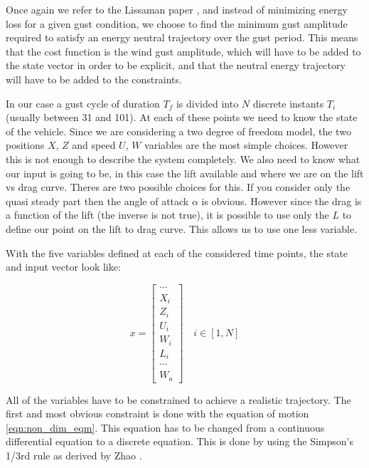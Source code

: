 \par Once again we refer to the Lissaman paper \cite{Lissaman2007neutral}, and instead of minimizing energy loss for a given gust condition, we choose to find the minimum gust amplitude required to satisfy an energy neutral trajectory over the gust period.
This means that the cost function is the wind gust amplitude, which will have to be added to the state vector in order to be explicit, and that the neutral energy trajectory will have to be added to the constraints.

In our case a gust cycle of duration $T_f$ is divided into $N$ discrete instants $T_i$ (usually between 31 and 101).
At each of these points we need to know the state of the vehicle.
Since we are considering a two degree of freedom model, the two positions $X$, $Z$ and speed $U$, $W$ variables are the most simple choices.
However this is not enough to describe the system completely.
We also need to know what our input is going to be, in this case the lift available and where we are on the lift vs drag curve.
Theres are two possible choices for this.
If you consider only the quasi steady part then the angle of attack $\alpha$ is obvious.
However since the drag is a function of the lift (the inverse is not true), it is possible to use only the $L$ to define our point on the lift to drag curve.
This allows us to use one less variable.

\par With the five variables defined at each of the considered time points, the state and input vector look like:

\begin{equation}
  x= 
  \begin{bmatrix}
    \cdots \\
    X_i \\
    Z_i \\
    U_i \\
    W_i \\
    L_i \\
    \cdots \\
    W_a
  \end{bmatrix}
  \quad i \in [1,N]
  \label{eqn:big_vector}
\end{equation}

\par All of the variables have to be constrained to achieve a realistic trajectory.
The first and most obvious constraint is done with the equation of motion \ref{eqn:non_dim_eqm}.
This equation has to be changed from a continuous differential equation to a discrete equation.
This is done by using the Simpson's 1/3rd rule as derived by Zhao \cite{zhao2004optimal}.

